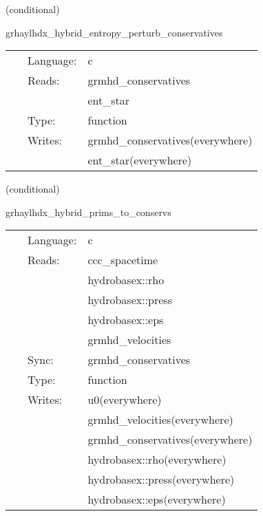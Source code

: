\vspace{5mm}

   (conditional) 

\hspace{5mm} grhaylhdx\_hybrid\_entropy\_perturb\_conservatives 

\hspace{5mm}{\it entropy+hybrid version of grhaylhdx\_perturb\_conservatives } 


\hspace{5mm}

 \begin{tabular*}{160mm}{cll} 
~ & Language:  & c \\ 
~ & Reads:  & grmhd\_conservatives \\ 
~& ~ &ent\_star\\ 
~ & Type:  & function \\ 
~ & Writes:  & grmhd\_conservatives(everywhere) \\ 
~& ~ &ent\_star(everywhere)\\ 
\end{tabular*} 


\vspace{5mm}

   (conditional) 

\hspace{5mm} grhaylhdx\_hybrid\_prims\_to\_conservs 

\hspace{5mm}{\it hybrid version of grhaylhdx\_prims\_to\_conservs } 


\hspace{5mm}

 \begin{tabular*}{160mm}{cll} 
~ & Language:  & c \\ 
~ & Reads:  & ccc\_spacetime \\ 
~& ~ &hydrobasex::rho\\ 
~& ~ &hydrobasex::press\\ 
~& ~ &hydrobasex::eps\\ 
~& ~ &grmhd\_velocities\\ 
~ & Sync:  & grmhd\_conservatives \\ 
~ & Type:  & function \\ 
~ & Writes:  & u0(everywhere) \\ 
~& ~ &grmhd\_velocities(everywhere)\\ 
~& ~ &grmhd\_conservatives(everywhere)\\ 
~& ~ &hydrobasex::rho(everywhere)\\ 
~& ~ &hydrobasex::press(everywhere)\\ 
~& ~ &hydrobasex::eps(everywhere)\\ 
\end{tabular*} 


